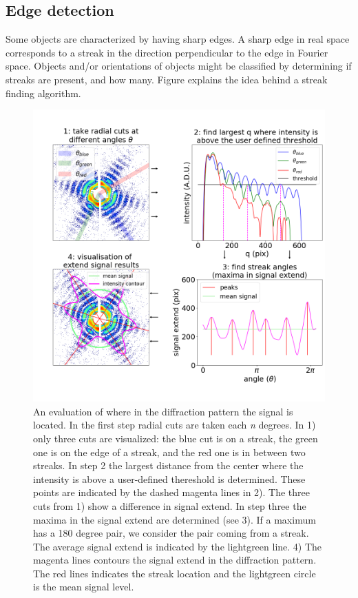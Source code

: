 \subsection{Edge detection}
Some objects are characterized by having sharp edges. A sharp edge in real space corresponds to a streak in the direction perpendicular to the edge in Fourier space. Objects and/or orientations of objects might be classified by determining if streaks are present, and how many. Figure explains the idea behind a streak finding algorithm.

\begin{figure}[h]
\centering
\includegraphics[width=120mm]{Chapter_08_ImageClassification_Edge_Detection.png}
\caption{An evaluation of where in the diffraction pattern the signal is located. In the first step radial cuts are taken each \textit{n} degrees. In 1) only three cuts are visualized: the blue cut is on a streak, the green one is on the edge of a streak, and the red one is in between two streaks. In step 2 the largest distance from the center where the intensity is above a user-defined thereshold is determined. These points are indicated by the dashed magenta lines in 2). The three cuts from 1) show a difference in signal extend. In step three the maxima in the signal extend are determined (see 3). If a maximum has a 180 degree pair, we consider the pair coming from a streak. The average signal extend is indicated by the lightgreen line. 4) The magenta lines contours the signal extend in the diffraction pattern. The red lines indicates the streak location and the lightgreen circle is the mean signal level.}\label{fig:edge_detection}
\end{figure}


